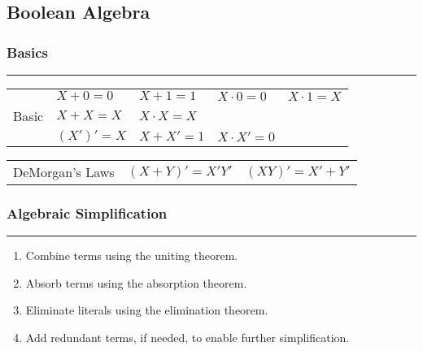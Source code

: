 \documentclass{article}
\begin{document}

    \tableofcontents
    \pagebreak


    \begin{center}
        \subsection*{Boolean Algebra}
    \end{center}

    \medskip
    \subsubsection*{Basics}
    \vspace{-1em}
    \rule{\linewidth}{0.05mm}


    \renewcommand{\arraystretch}{1.6}
    \vspace{2em}
    \begin{center}
        \begin{tabular}{ r | l l l l}
            & $X+0=0$ & $X+1=1$ & $X\cdot0=0$ & $X\cdot 1 = X$ \\
            Basic & $X+X=X$ & $X\cdot X=X$ \\
            & $(X')'=X$ & $X+X'=1$ & $X\cdot X'=0$ \\
        \end{tabular}
    \end{center}

    \smallskip
    \begin{center}
        \begin{tabular}{ r | l l}
            DeMorgan's Laws & $(X+Y)'=X'Y'$ & $(XY)' = X'+Y'$ \\
        \end{tabular}
    \end{center}

    \medskip\noindent
    \subsubsection*{Algebraic Simplification}
    \vspace{-1em}
    \rule{\linewidth}{.1mm}

    \smallskip\noindent

    \begin{enumerate}
        \item Combine terms using the uniting theorem.
        \item Absorb terms using the absorption theorem.
        \item Eliminate literals using the elimination theorem.
        \item Add redundant terms, if needed, to enable further simplification.
    \end{enumerate}
\end{document}
